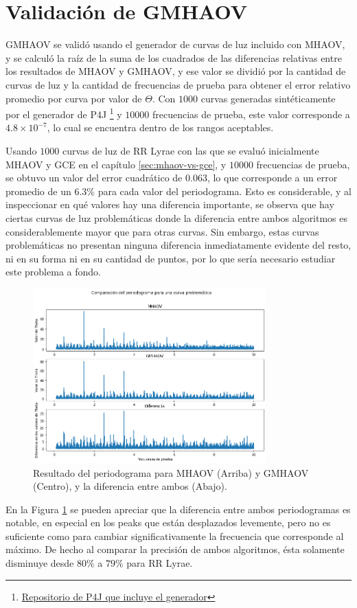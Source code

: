 \section{Validación de GMHAOV}\label{sec:validacion}
GMHAOV se validó usando el generador de curvas de luz incluido con MHAOV, y se calculó la raíz de la suma de los cuadrados de las diferencias relativas entre los resultados de MHAOV y GMHAOV, y ese valor se dividió por la cantidad de curvas de luz y la cantidad de frecuencias de prueba para obtener el error relativo promedio por curva por valor de $\Theta$. Con $1000$ curvas generadas sintéticamente por el generador de P4J \footnote{\href{https://github.com/alercebroker/P4J}{Repositorio de P4J que incluye el generador}} y $10000$ frecuencias de prueba, este valor corresponde a $4.8 \times 10^{-7}$, lo cual se encuentra dentro de los rangos aceptables.

Usando $1000$ curvas de luz de  RR Lyrae con las que se evaluó inicialmente MHAOV y GCE en el capítulo \ref{sec:mhaov-vs-gce}, y $10000$ frecuencias de prueba, se obtuvo un valor del error cuadrático de $0.063$, lo que corresponde a un error promedio de un $6.3\%$ para cada valor del periodograma. Esto es considerable, y al inspeccionar en qué valores hay una diferencia importante, se observa que hay ciertas curvas de luz problemáticas donde la diferencia entre ambos algoritmos es considerablemente mayor que para otras curvas. Sin embargo, estas curvas problemáticas no presentan ninguna diferencia inmediatamente evidente del resto, ni en su forma ni en su cantidad de puntos, por lo que sería necesario estudiar este problema a fondo.

\begin{figure}[H]
    \centering
    \includegraphics[width=0.8\textwidth]{figs/problemas.png}
    \caption{Resultado del periodograma para MHAOV (Arriba) y GMHAOV (Centro), y la diferencia entre ambos (Abajo).}
    \label{fig:problemas}
\end{figure}
En la Figura \ref{fig:problemas} se pueden apreciar que la diferencia entre ambos periodogramas es notable, en especial en los peaks que están desplazados levemente, pero no es suficiente como para cambiar significativamente la frecuencia que corresponde al máximo. De hecho al comparar la precisión de ambos algoritmos, ésta solamente disminuye desde $80\%$ a $79\%$ para RR Lyrae.

